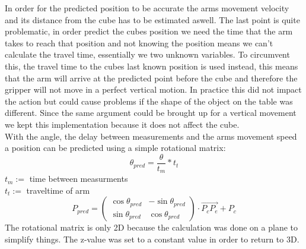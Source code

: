 \documentclass[report]{iisthesis}
\begin{document}
In order for the predicted position to be accurate the arms movement velocity and its distance from the cube has to be estimated aswell.
The last point is quite problematic, in order predict the cubes position we need the time that the arm takes to reach that position and not knowing the position means we can't calculate the travel time, 
essentially we two unknown variables.
To circumvent this, the travel time to the cubes last known position is used instead, this means that the arm will arrive at the predicted point before the cube 
and therefore the gripper will not move in a perfect vertical motion. In practice this did not impact the action but could cause problems if the shape of the object on the table was different.
Since the same argument could be brought up for a vertical movement we kept this implementation because it does not affect the cube. \\
With the angle, the delay between measurements and the arms movement speed a position can be predicted using a simple rotational matrix:
$$
\theta_{pred} = \frac{\theta}{t_m} * t_t
$$
$t_m :=$ time between measurments \\
$t_t :=$ traveltime of arm 
$$
P_{pred} =
\begin{pmatrix}
    \cos\theta_{pred} & -\sin\theta_{pred} \\
    \sin\theta_{pred} & \cos\theta_{pred}
\end{pmatrix}
\cdot \overrightarrow{P_cP_e}
+ P_c
$$
The rotational matrix is only 2D because the calculation was done on a plane to simplify things. The z-value was set to a constant value in order to return to 3D. 
\end{document}
